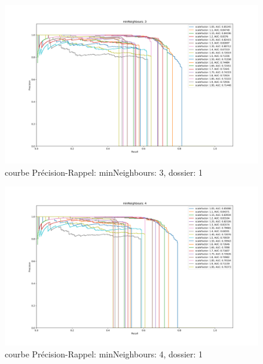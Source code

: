\documentclass[a4paper,11pt]{article}
\begin{document}
	\begin{figure}[H]
	    \begin{center}
		\includegraphics[scale = 0.4]{images/courbes/folder_01_minN_3.png}
		\caption{courbe Précision-Rappel: minNeighbours: 3, dossier: 1}
		\label{fig:minN_2}
	    \end{center}
	\end{figure}

	\begin{figure}[H]
	    \begin{center}
		\includegraphics[scale = 0.4]{images/courbes/folder_01_minN_4.png}
		\caption{courbe Précision-Rappel: minNeighbours: 4, dossier: 1}
		\label{fig:minN_2}
	    \end{center}
	\end{figure}
\end{document}
